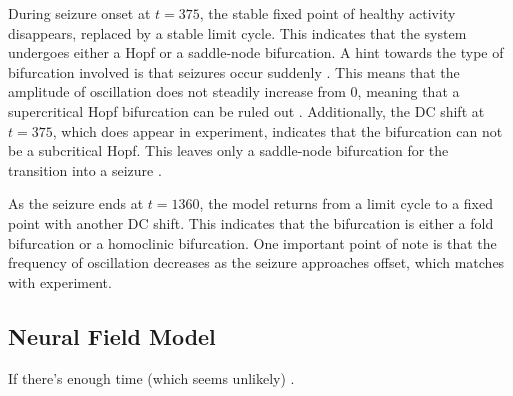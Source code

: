 During seizure onset at $t = 375$, the stable fixed point of healthy activity disappears, replaced by a stable limit cycle.
This indicates that the system undergoes either a Hopf or a saddle-node bifurcation.
A hint towards the type of bifurcation involved is that seizures occur suddenly \cite{Kandel2013}.
This means that the amplitude of oscillation does not steadily increase from 0, meaning that a supercritical Hopf bifurcation can be ruled out \cite{Strogatz2015}.
Additionally, the DC shift at $t = 375$, which does appear in experiment, indicates that the bifurcation can not be a subcritical Hopf.
This leaves only a saddle-node bifurcation for the transition into a seizure \cite{Jirsa2014}.

As the seizure ends at $t = 1360$, the model returns from a limit cycle to a fixed point with another DC shift.
This indicates that the bifurcation is either a fold bifurcation or a homoclinic bifurcation.
One important point of note is that the frequency of oscillation decreases as the seizure approaches offset, which matches with experiment.


\subsection{Neural Field Model}
\label{sec:lit_review_bifurcation_field}
If there's enough time (which seems unlikely) \cite{Breakspear2005}.


